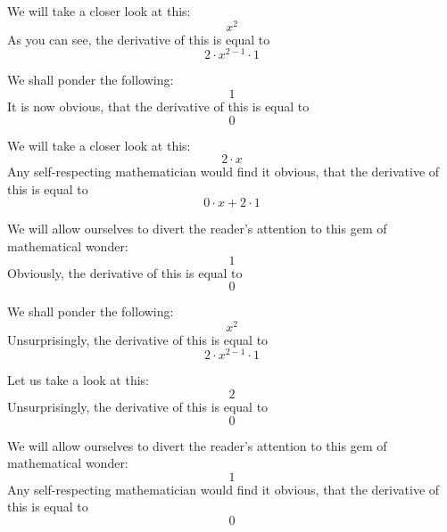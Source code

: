 \documentclass{article}
\begin{document}
We will take a closer look at this:
\begin{equation}
x ^{2 } 
\end{equation}
As you can see, the derivative of this is equal to
\begin{equation}
2 \cdot x ^{2 - 1 } \cdot 1 
\end{equation}

We shall ponder the following:
\begin{equation}
1 
\end{equation}
It is now obvious, that the derivative of this is equal to
\begin{equation}
0 
\end{equation}

We will take a closer look at this:
\begin{equation}
2 \cdot x 
\end{equation}
Any self-respecting mathematician would find it obvious, that the derivative of this is equal to
\begin{equation}
0 \cdot x + 2 \cdot 1 
\end{equation}

We will allow ourselves to divert the reader's attention to this gem of mathematical wonder:
\begin{equation}
1 
\end{equation}
Obviously, the derivative of this is equal to
\begin{equation}
0 
\end{equation}

We shall ponder the following:
\begin{equation}
x ^{2 } 
\end{equation}
Unsurprisingly, the derivative of this is equal to
\begin{equation}
2 \cdot x ^{2 - 1 } \cdot 1 
\end{equation}

Let us take a look at this:
\begin{equation}
2 
\end{equation}
Unsurprisingly, the derivative of this is equal to
\begin{equation}
0 
\end{equation}

We will allow ourselves to divert the reader's attention to this gem of mathematical wonder:
\begin{equation}
1 
\end{equation}
Any self-respecting mathematician would find it obvious, that the derivative of this is equal to
\begin{equation}
0 
\end{equation}
\end{document}
